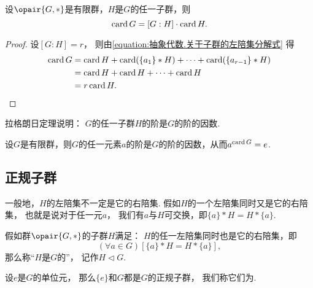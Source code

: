 \begin{theorem}[拉格朗日定理]
设\(\opair{G,*}\)是有限群，\(H\)是\(G\)的任一子群，则\begin{equation*}
	\operatorname{card} G = [G:H] \cdot \operatorname{card} H.
\end{equation*}
\begin{proof}
设\([G:H]=r\)，
则由\cref{equation:抽象代数.关于子群的左陪集分解式} 得\begin{align*}
	\operatorname{card} G
	&= \operatorname{card} H + \operatorname{card}(\{a_1\} * H) + \dotsb + \operatorname{card}(\{a_{r-1}\} * H) \\
	&= \operatorname{card} H + \operatorname{card} H + \dotsb + \operatorname{card} H \\
	&= r \operatorname{card} H.
	\qedhere
\end{align*}
\end{proof}
\end{theorem}
拉格朗日定理说明：
\(G\)的任一子群\(H\)的阶是\(G\)的阶的因数.

\begin{corollary}
设\(G\)是有限群，则\(G\)的任一元素\(a\)的阶是\(G\)的阶的因数，从而\(a^{\operatorname{card} G}=e\).
\end{corollary}


\endgroup%

\subsection{正规子群}
一般地，\(H\)的左陪集不一定是它的右陪集.
假如\(H\)的一个左陪集同时又是它的右陪集，
也就是说对于任一元\(a\)，
我们有\(a\)与\(H\)可交换，即\(\{a\} * H = H * \{a\}\).
\begin{definition}
假如群\(\opair{G,*}\)的子群\(H\)满足：
\(H\)的任一左陪集同时也是它的右陪集，即\begin{equation*}
	(\forall a\in G)[\{a\} * H = H * \{a\}],
\end{equation*}
那么称“\(H\)是\(G\)的”，
记作\(H \triangleleft G\).
\end{definition}

设\(e\)是\(G\)的单位元，
那么\(\{e\}\)和\(G\)都是\(G\)的正规子群，
我们称它们为.
